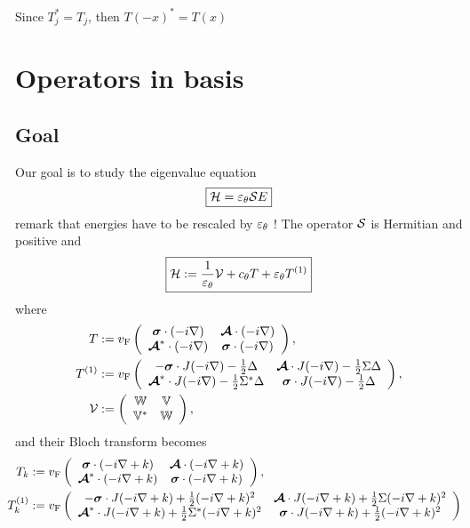 \documentclass[11pt,a4paper,reqno,french,tikz]{amsart}
\let\p\relax\newcommand{\p}{\psi} %
\newcommand{\na}{\nabla} %
\newcommand{\f}[2]{\frac{#1}{#2}} %
\newcommand{\bbV}{\mathbb{V}}
\def\bbV{{\mathbb V}}
\def\bbW{{\mathbb W}}
\begin{document}
Since $T_j^* = T_j$, then $T(-x)^* = T(x)$




\section{Operators in basis}%
\label{sec:operators_in_basis}


\subsection{Goal}%
\label{sub:goal}
Our goal is to study the eigenvalue equation
\begin{align*}
\boxed{\cH \p = \ep_\theta \cS E \p}
\end{align*}
remark that energies have to be rescaled by $\varepsilon_\theta$ ! The operator $\mathcal{S}$ is Hermitian and positive and
\begin{align*}
\boxed{\cH := \f{1}{\ep_\theta} \cV + c_\theta T + \ep_\theta T^{(1)}}
\end{align*}
where
\begin{align*}
T &:=  v_{\rm F} \left( \begin{array}{cc} \bm\sigma \cdot (-i \nabla)  &  \bm{\mathcal A} \cdot (-i\nabla)   \\  \bm{\mathcal A}^* \cdot (-i\nabla) &  \bm\sigma \cdot (-i \nabla)  \end{array} \right),  \\
T^{(1)} &:= v_{\rm F} \left( \begin{array}{cc}  -  \bm\sigma \cdot J (-i \nabla) - \frac 12  \Delta &  \bm{\mathcal A} \cdot J (-i\nabla) - \frac 12  \Sigma \Delta  \\  \bm{\mathcal A}^*  \cdot J (-i\nabla) - \frac 12 \Sigma^* \Delta &  \bm\sigma \cdot J (-i \nabla) - \frac 12   \Delta \end{array} \right), \\
\cV &:=  \left( \begin{array}{cc}  \bbW &   \bbV \\   \bbV^* &   \bbW \end{array} \right),
\end{align*}
and their Bloch transform becomes
\begin{align*}
T_k &:=  v_{\rm F} \left( \begin{array}{cc} \bm\sigma \cdot (-i\na +k)  &  \bm{\mathcal A} \cdot (-i\na +k)   \\  \bm{\mathcal A}^* \cdot (-i\na +k) &  \bm\sigma \cdot (-i\na +k)  \end{array} \right),  \\
\hspace{-5cm} T_k^{(1)} &:= v_{\rm F} \left( \begin{array}{cc}  -  \bm\sigma \cdot J (-i\na +k) +\f 12  (-i\na +k)^2 &  \bm{\mathcal A} \cdot J (-i\na +k) +\f 12  \Sigma (-i\na +k)^2  \\  \bm{\mathcal A}^*  \cdot J (-i\na +k) +\f 12 \Sigma^* (-i\na +k)^2 &  \bm\sigma \cdot J (-i\na +k) +\f 12   (-i\na +k)^2 \end{array} \right)
\end{align*}
\end{document}
